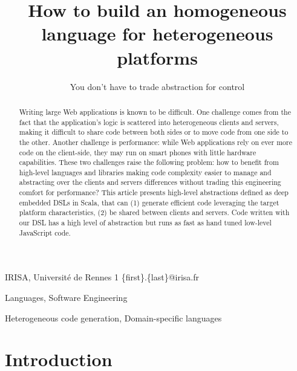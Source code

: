 \documentclass[preprint]{sigplanconf}
\begin{document}
\copyrightdata{[to be supplied]} 


\title{How to build an homogeneous language for heterogeneous platforms}
\subtitle{You don’t have to trade abstraction for control}

           {IRISA, Université de Rennes 1}
           {\{first\}.\{last\}@irisa.fr}

\maketitle

\begin{abstract}
Writing large Web applications is known to be difficult. One challenge comes from the fact that the application's
logic is scattered into heterogeneous clients and servers, making it difficult to share code between both sides or to
move code from one side to the other. Another challenge is performance: while Web applications rely on ever more
code on the client-side, they may run on smart phones with little hardware capabilities. These two challenges raise
the following problem: how to benefit from high-level languages and libraries making code complexity easier to manage
and abstracting over the clients and servers differences without trading this engineering comfort for performance?
This article presents high-level abstractions defined as deep embedded DSLs in Scala, that can (1) generate efficient
code leveraging the target platform characteristics, (2) be shared between clients and servers. Code written with
our DSL has a high level of abstraction but runs as fast as hand tuned low-level JavaScript code.
\end{abstract}


\terms Languages, Software Engineering

\keywords Heterogeneous code generation, Domain-specific languages

\section{Introduction}
\end{document}
